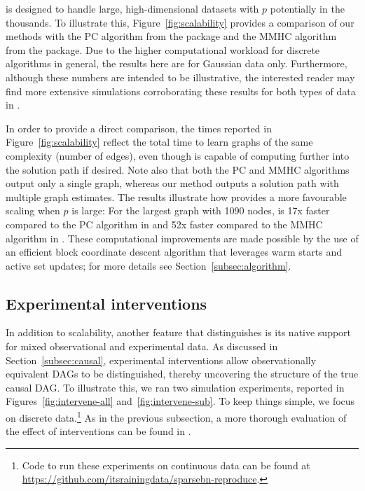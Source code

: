 \documentclass[article]{jss}
\renewcommand{\|}{\,|\,}
\begin{document}
 is designed to handle large, high-dimensional datasets with $p$ potentially in the thousands. To illustrate this, Figure~\ref{fig:scalability} provides a comparison of our methods with the PC algorithm from the  package and the MMHC algorithm from the  package. Due to the higher computational workload for discrete algorithms in general, the results here are for Gaussian data only. Furthermore, although these numbers are intended to be illustrative, the interested reader may find more extensive simulations corroborating these results for both types of data in \citet{aragam2015,gu2018}.

In order to provide a direct comparison, the times reported in Figure~\ref{fig:scalability} reflect the total time to learn graphs of the same complexity (number of edges), even though  is capable of computing further into the solution path if desired. Note also that both the PC and MMHC algorithms output only a single graph, whereas our method outputs a solution path with multiple graph estimates. The results illustrate how  provides a more favourable scaling when $p$ is large: For the largest graph with 1090 nodes,  is 17x faster compared to the PC algorithm in  and 52x faster compared to the MMHC algorithm in . These computational improvements are made possible by the use of an efficient block coordinate descent algorithm that leverages warm starts and active set updates; for more details see Section~\ref{subsec:algorithm}.

\subsection{Experimental interventions}

In addition to scalability, another feature that distinguishes  is its native support for mixed observational and experimental data. As discussed in Section~\ref{subsec:causal}, experimental interventions allow observationally equivalent DAGs to be distinguished, thereby uncovering the structure of the true causal DAG. To illustrate this, we ran two simulation experiments, reported in Figures~\ref{fig:intervene-all} and~\ref{fig:intervene-sub}. To keep things simple, we focus on discrete data.\footnote{Code to run these experiments on continuous data can be found at \url{https://github.com/itsrainingdata/sparsebn-reproduce}.} As in the previous subsection, a more thorough evaluation of the effect of interventions can be found in \citet{gu2018,zhang2016,fu2013}.
\end{document}

